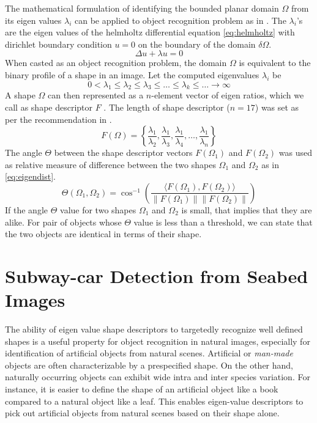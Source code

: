 \documentclass {udthesis}
\begin{document}
The mathematical formulation of identifying the bounded planar domain $\Omega$ from its eigen values $\lambda_{i}$ can be applied to object recognition problem as in \cite{khabou, zuliani}. The $\lambda_{i}$'s are the eigen values of the helmholtz differential equation \eqref{eq:helmholtz} with dirichlet boundary condition $u=0$ on the boundary of the domain $\delta\Omega$.
%
\begin{equation} \label{eq:helmholtz}
\Delta u+\lambda u = 0
\end{equation}
%
When casted as an object recognition problem, the domain $\Omega$ is equivalent to the binary profile of a shape in an image.
Let the computed eigenvalues $\lambda_i$ be
%
\begin{equation} \label{eq:eigenvalue}
0<\lambda_{1}\leq\lambda_{2}\leq\lambda_{3}\leq\dots\leq\lambda_{k}\leq\dots\rightarrow\infty
\end{equation}
%
A shape $\Omega$ can then represented as a $n$-element vector of eigen ratios, which we call as shape descriptor $F$ . The length of shape descriptor ($n=17$) was set as per the recommendation in \cite{zuliani}.
%
\begin{equation} \label{eq:eigenratio}
F(\Omega) = \left\{\frac{\lambda_{1}}{\lambda_{2}},\frac{\lambda_{1}}{\lambda_{3}},\frac{\lambda_{1}}{\lambda_{4}},\dots,\frac{\lambda_{1}}{\lambda_{n}}\right\}
\end{equation}
%
The angle $\Theta$ between the shape descriptor vectors $F(\Omega_{1})$ and $F(\Omega_{2})$ was used as relative measure of difference between the two shapes $\Omega_{1}$ and $\Omega_{2}$ as in \eqref{eq:eigendist}.
%
\begin{equation} \label{eq:eigendist}
\Theta\left(\Omega_{1},\Omega_{2}\right)=\cos^{-1}\left(\frac{\langle F(\Omega_{1}),F(\Omega_{2})\rangle}{\|F(\Omega_{1})\|\|F(\Omega_{2})\|}\right)
\end{equation}
%
If the angle $\Theta$ value for two shapes $\Omega_{1}$ and $\Omega_{2}$ is small, that implies that they are alike.
For pair of objects whose $\Theta$ value is less than a threshold, 
we can state that the two objects are identical in terms of their shape.


\section{Subway-car Detection from Seabed Images} \label{sec:subwaycar_results}


The ability of eigen value shape descriptors to targetedly recognize well defined shapes is a useful property for object recognition in natural images, especially for identification of artificial objects from natural scenes. Artificial or \textit{man-made} objects are often characterizable by a prespecified shape. On the other hand, naturally occurring objects can exhibit wide intra and inter species variation. For instance, it is easier to define the shape of an artificial object like a book compared to a natural object like a leaf. This enables eigen-value descriptors to pick out artificial objects from natural scenes based on their shape alone.
\end{document}
